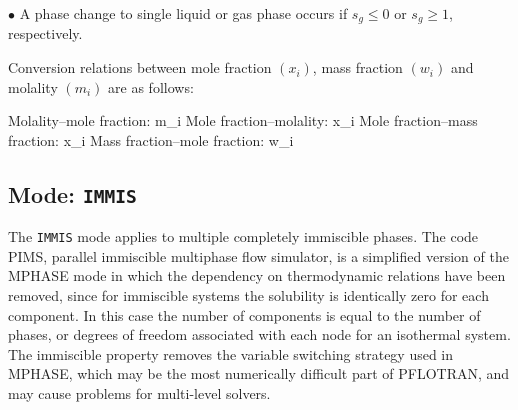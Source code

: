\documentclass[12pt]{article}
\begin{document}
\noindent
$\bullet$ A phase change to single liquid or gas phase occurs if $s_g \leq 0$ or $s_g\geq 1$, respectively.

Conversion relations between mole fraction $(x_i)$, mass fraction $(w_i)$ and molality $(m_i)$ are as follows:

\noindent
Molality--mole fraction:
\EQ
m_i \eq {} \eq {} \eq {} \eq {}
\EN
Mole fraction--molality:
\EQ
x_i \eq {} \eq {} \eq {} \eq {}
\EN
Mole fraction--mass fraction:
\EQ
x_i \eq {} \eq {} \eq {}
\EN
Mass fraction--mole fraction:
\EQ
w_i \eq {} \eq {} \eq {}
\EN

\subsection{Mode: {\tt IMMIS}}

The {\tt IMMIS} mode applies to multiple completely immiscible phases.
The code PIMS, parallel immiscible multiphase flow simulator, is a simplified version of the  MPHASE mode in which the dependency on thermodynamic relations have been removed, since for immiscible systems the solubility is identically zero for each component. In this case the number of components is equal to the number of phases, or degrees of freedom associated with each node for an isothermal system. The immiscible property removes the variable switching strategy used in MPHASE, which may be the most numerically difficult part of PFLOTRAN, and may cause problems for multi-level solvers. 
\end{document}
